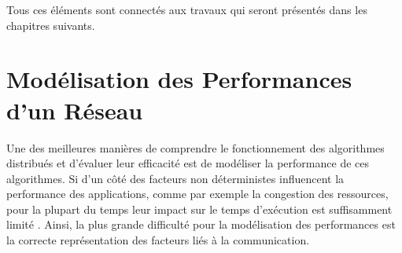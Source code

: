 \begin{resume}
Tous ces éléments sont connectés aux travaux qui seront présentés dans les chapitres suivants.  
%
%
%
%

\end{resume}

\section{Modélisation des Performances d'un Réseau\label{sec:reseaux-model}}


Une des meilleures manières de comprendre le fonctionnement des algorithmes
distribués et d'évaluer leur efficacité est de modéliser la performance
de ces algorithmes. Si d'un côté des facteurs non
déterministes influencent la performance des applications,
comme par exemple la congestion des ressources, pour la plupart du
temps leur impact sur le temps d'exécution est suffisamment
limité \cite{Grove03}. Ainsi, la plus grande difficulté pour la modélisation
des performances est la correcte représentation des facteurs liés
à la communication.  

